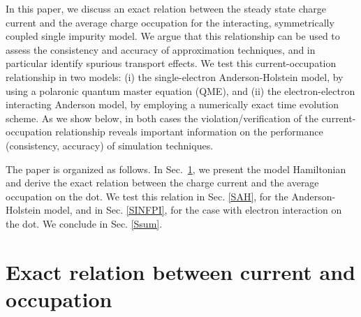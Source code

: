 \documentclass[aps,pra,twocolumn,groupedaddress,showpacs,superscriptaddress,amssymb,amsmath]{revtex4-1}
\begin{document}

In this paper, we discuss an exact relation between the steady state charge current and the average 
charge occupation for the interacting, symmetrically coupled single impurity model. %
We argue that this relationship can be used to assess the consistency and accuracy of approximation techniques,
and in particular identify spurious transport effects.
We test this current-occupation relationship in two models: 
(i) the single-electron Anderson-Holstein model, by using a polaronic quantum master equation (QME), 
and (ii) the electron-electron interacting Anderson model, by employing a numerically exact time evolution scheme.
As we show below, in both cases the violation/verification of the 
current-occupation relationship reveals important information 
on the performance (consistency, accuracy) of simulation techniques.

The paper is organized as follows. 
In Sec.~\ref{SModel}, we present the model Hamiltonian and derive the exact relation between 
the charge current and the average occupation on the dot. 
We test this relation in Sec. \ref{SAH}, 
for the Anderson-Holstein model, and in Sec. \ref{SINFPI}, for the case with electron interaction on the dot.
We conclude in Sec. \ref{Ssum}.


\section{Exact relation between current and occupation}
\label{SModel}
\end{document}
